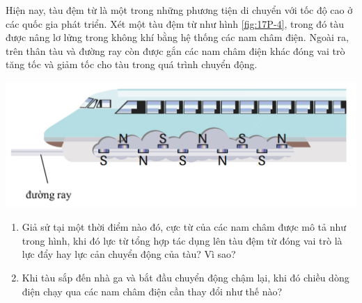 \begin{ex}
	Hiện nay, tàu đệm từ là một trong những phương tiện di chuyển với tốc độ cao ở các quốc gia phát triển. Xét một tàu đệm từ như hình \ref{fig:17P-4}, trong đó tàu được nâng lơ lửng trong không khí bằng hệ thống các nam châm điện. Ngoài ra, trên thân tàu và đường ray còn được gắn các nam châm điện khác đóng vai trò tăng tốc và giảm tốc cho tàu trong quá trình chuyển động.
	\begin{center}
		\includegraphics[width=0.6\linewidth]{figs/VN12-Y24-PH-SYL-017P-4}
		\label{fig:17P-4}
	\end{center}	
	\begin{enumerate}[label=\alph*)]
		\item Giả sử tại một thời điểm nào đó, cực từ của các nam châm được mô tả như trong hình, khi đó lực từ tổng hợp tác dụng lên tàu đệm từ đóng vai trò là lực đẩy hay lực cản chuyển động của tàu? Vì sao?
		\item Khi tàu sắp đến nhà ga và bắt đầu chuyển động chậm lại, khi đó chiều dòng điện chạy qua các nam châm điện cần thay đổi như thế nào?
	\end{enumerate}
\end{ex}
